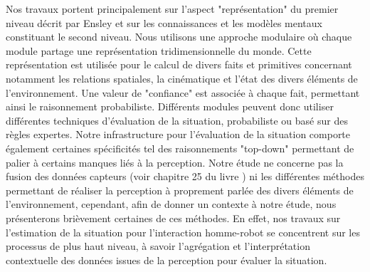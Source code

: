 \documentclass[a4paper,11pt,twoside]{StyleThese}
\begin{document}
Nos travaux portent principalement sur l'aspect "représentation" du premier niveau décrit par Ensley et sur les connaissances et les modèles mentaux constituant le second niveau.
Nous utilisons une approche modulaire où chaque module partage une représentation tridimensionnelle du monde. Cette représentation est utilisée pour le calcul de divers faits et primitives concernant notamment les relations spatiales, la cinématique et l'état des divers éléments de l'environnement.
Une valeur de "confiance" est associée à chaque fait, permettant ainsi le raisonnement probabiliste. Différents modules peuvent donc utiliser différentes techniques d'évaluation de la situation, probabiliste ou basé sur des règles expertes. Notre infrastructure pour l'évaluation de la situation comporte également certaines spécificités tel des raisonnements "top-down" permettant de palier à certains manques liés à la perception.
Notre étude ne concerne pas la fusion des données capteurs (voir chapitre 25 du livre \cite{siciliano2008springer}) ni les différentes méthodes permettant de réaliser la perception à proprement parlée des divers éléments de l'environnement, cependant, afin de donner un contexte à notre étude, nous présenterons brièvement certaines de ces méthodes. En effet, nos travaux sur l'estimation de la situation pour l'interaction homme-robot se concentrent sur les processus de plus haut niveau, à savoir l'agrégation et l'interprétation contextuelle des données issues de la perception pour évaluer la situation.

\end{document}

